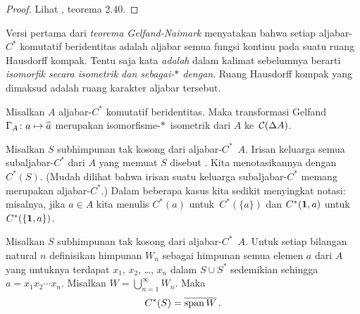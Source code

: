 \begin{proof} Lihat \cite{Douglas:1972}, teorema 2.40. \ns \end{proof}

Versi pertama dari \emph{teorema Gelfand-Naimark} menyatakan bahwa setiap aljabar-$C^*$ komutatif
beridentitas adalah aljabar semua fungsi kontinu pada suatu ruang Hausdorff kompak. Tentu saja kata
\emph{adalah} dalam kalimat sebelumnya berarti \emph{isomorfik secara isometrik dan sebagai-$*$ dengan}.
Ruang Hausdorff kompak yang dimaksud adalah ruang karakter aljabar tersebut.

\begin{thm}\label{00142} Misalkan $A$ aljabar-$C^*$ komutatif
beridentitas. Maka transformasi Gelfand $\Gamma_A\colon a \mapsto \widehat{a}$ merupakan
isomorfisme-$*\,$ isometrik dari $A$ ke~$\mathcal{C}(\Delta A)$.
\end{thm}






\begin{defn} Misalkan $S$ subhimpunan tak kosong dari aljabar-$C^*$~$A$. Irisan
keluarga semua subaljabar-$C^*$ dari $A$ yang memuat $S$ disebut
. Kita menotasikannya dengan
$C^*(S)$. (Mudah dilihat bahwa irisan suatu keluarga subaljabar-$C^*$ memang merupakan
aljabar-$C^*$.) Dalam beberapa kasus kita sedikit menyingkat notasi: misalnya, jika $a \in A$ kita
menulis $C^*(a)$ untuk~$C^*(\{a\})$ dan $C^*(\mathbf{1},a)$ untuk $C^*(\{\mathbf{1},a\})$.
\end{defn}

\begin{prop} Misalkan $S$ subhimpunan tak kosong dari aljabar-$C^*$~$A$. Untuk setiap bilangan natural
$n$ definisikan himpunan $W_n$ sebagai himpunan semua elemen $a$ dari $A$ yang untuknya terdapat
$x_1$, $x_2$, \dots, $x_n$ dalam $S \cup S^*$ sedemikian sehingga $a = x_1x_2\cdots x_n$. Misalkan
$W = \bigcup_{n=1}^\infty W_n$. Maka
   \[ C^*(S) = \overline{\operatorname{span} W}\,. \]
\end{prop}













